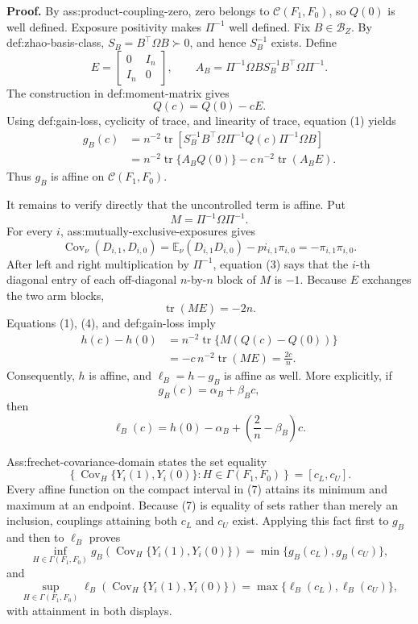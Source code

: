 \textbf{Proof.}
By ass:product-coupling-zero, zero belongs to \(\mathcal C(F_1,F_0)\), so \(Q(0)\) is well defined.  Exposure positivity makes \(\Pi^{-1}\) well defined.  Fix \(B\in\mathcal B_Z\).  By def:zhao-basis-class, \(S_B=B^{\top}\Omega B\succ0\), and hence \(S_B^{-1}\) exists.  Define
\[
E=\begin{bmatrix}0&I_n\\ I_n&0\end{bmatrix},
\qquad
A_B=\Pi^{-1}\Omega B S_B^{-1}B^{\top}\Omega\Pi^{-1}.
\]
The construction in def:moment-matrix gives
\[
Q(c)=Q(0)-cE.                                                    \tag{1}
\]
Using def:gain-loss, cyclicity of trace, and linearity of trace, equation (1) yields
\[
\begin{aligned}
g_B(c)
&=n^{-2}\operatorname{tr}\!\left[
S_B^{-1}B^{\top}\Omega\Pi^{-1}Q(c)\Pi^{-1}\Omega B
\right]\\
&=n^{-2}\operatorname{tr}\{A_BQ(0)\}
-c\,n^{-2}\operatorname{tr}(A_BE).
\end{aligned}                                                     \tag{2}
\]
Thus \(g_B\) is affine on \(\mathcal C(F_1,F_0)\).

It remains to verify directly that the uncontrolled term is affine.  Put
\[
M=\Pi^{-1}\Omega\Pi^{-1}.
\]
For every \(i\), ass:mutually-exclusive-exposures gives
\[
\operatorname{Cov}_{\nu}(D_{i,1},D_{i,0})
=\mathbb E_{\nu}(D_{i,1}D_{i,0})-pi_{i,1}\pi_{i,0}
=-\pi_{i,1}\pi_{i,0}.                                            \tag{3}
\]
After left and right multiplication by \(\Pi^{-1}\), equation (3) says that the \(i\)-th diagonal entry of each off-diagonal \(n\)-by-\(n\) block of \(M\) is \(-1\).  Because \(E\) exchanges the two arm blocks,
\[
\operatorname{tr}(ME)=-2n.                                       \tag{4}
\]
Equations (1), (4), and def:gain-loss imply
\[
\begin{aligned}
h(c)-h(0)
&=n^{-2}\operatorname{tr}\{M(Q(c)-Q(0))\}\\
&=-c\,n^{-2}\operatorname{tr}(ME)
=\frac{2c}{n}.                                                     
\end{aligned}                                                     \tag{5}
\]
Consequently, \(h\) is affine, and \(\ell_B=h-g_B\) is affine as well.  More explicitly, if
\[
g_B(c)=\alpha_B+\beta_Bc,
\]
then
\[
\ell_B(c)=h(0)-\alpha_B+\left(\frac{2}{n}-\beta_B\right)c.       \tag{6}
\]

Ass:frechet-covariance-domain states the set equality
\[
\left\{\operatorname{Cov}_H\{Y_i(1),Y_i(0)\}:
H\in\Gamma(F_1,F_0)\right\}=[c_L,c_U].                           \tag{7}
\]
Every affine function on the compact interval in (7) attains its minimum and maximum at an endpoint.  Because (7) is equality of sets rather than merely an inclusion, couplings attaining both \(c_L\) and \(c_U\) exist.  Applying this fact first to \(g_B\) and then to \(\ell_B\) proves
\[
\inf_{H\in\Gamma(F_1,F_0)}
g_B\!\left(\operatorname{Cov}_H\{Y_i(1),Y_i(0)\}\right)
=\min\{g_B(c_L),g_B(c_U)\},                                      \tag{8}
\]
and
\[
\sup_{H\in\Gamma(F_1,F_0)}
\ell_B\!\left(\operatorname{Cov}_H\{Y_i(1),Y_i(0)\}\right)
=\max\{\ell_B(c_L),\ell_B(c_U)\},                               \tag{9}
\]
with attainment in both displays.

